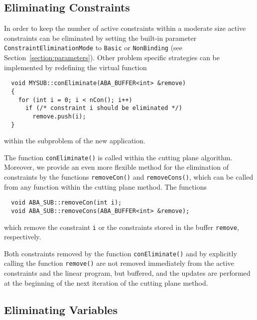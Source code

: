 \subsection{Eliminating Constraints}
\noindent
In order to keep the number of active constraints within a moderate size
active constraints can be eliminated by setting the built-in
parameter 
{\tt ConstraintEliminationMode} 
to {\tt Basic} or 
{\tt NonBinding} (see Section~\ref{section:parameters}). 
Other problem specific strategies can be implemented by
redefining the virtual function 
\begin{verbatim}
  void MYSUB::conEliminate(ABA_BUFFER<int> &remove)
  {
    for (int i = 0; i < nCon(); i++)
      if (/* constraint i should be eliminated */)
        remove.push(i);
  }
\end{verbatim}
within the subproblem of the new application.

The function {\tt conEliminate()} is called within the cutting plane algorithm.
Moreover, we provide an even more flexible method for the elimination
of constraints by the functions {\tt removeCon()} and {\tt removeCons()},
which can be called from any function within the cutting plane method.
The functions
\begin{verbatim}
  void ABA_SUB::removeCon(int i);
  void ABA_SUB::removeCons(ABA_BUFFER<int> &remove);
\end{verbatim}

\noindent
which remove the constraint {\tt i} or the constraints stored in the buffer
{\tt remove}, respectively.

Both constraints removed by the function {\tt conEliminate()} and by
explicitly calling the function {\tt remove()} are not removed immediately from the
active constraints and the linear program, but buffered, and the updates
are performed at the beginning of the next iteration of the cutting plane
method.

\subsection{Eliminating Variables}

